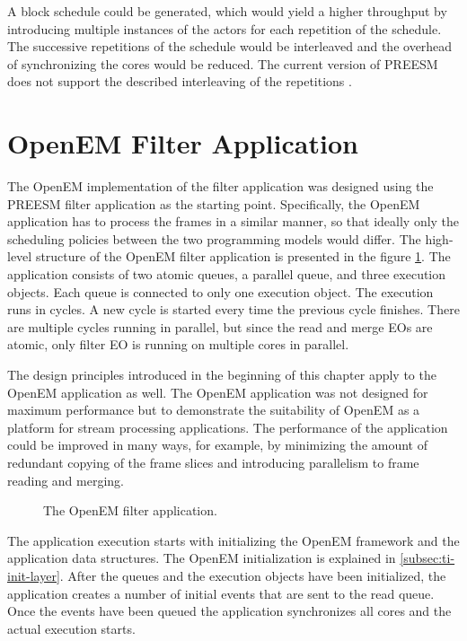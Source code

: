 A block schedule could be generated, which would yield a higher throughput by introducing multiple instances of the actors for each repetition of the schedule. The successive repetitions of the schedule would be interleaved and the overhead of synchronizing the cores would be reduced. The current version of PREESM does not support the described interleaving of the repetitions \cite{pelcat2014preesm}.

\section{OpenEM Filter Application}
\label{sec:oemapp}
The OpenEM implementation of the filter application was designed using the PREESM filter application as the starting point. Specifically, the OpenEM application has to process the frames in a similar manner, so that ideally only the scheduling policies between the two programming models would differ. The high-level structure of the OpenEM filter application is presented in the figure \ref{fig:openem_flow}. The application consists of two atomic queues, a parallel queue, and three execution objects. Each queue is connected to only one execution object. The execution runs in cycles. A new cycle is started every time the previous cycle finishes. There are multiple cycles running in parallel, but since the read and merge EOs are atomic, only filter EO is running on multiple cores in parallel.

The design principles introduced in the beginning of this chapter apply to the OpenEM application as well. The OpenEM application was not designed for maximum performance but to demonstrate the suitability of OpenEM as a platform for stream processing applications. The performance of the application could be improved in many ways, for example, by minimizing the amount of redundant copying of the frame slices and introducing parallelism to frame reading and merging.

\begin{figure}[h!]
    \begin{center}
        
        \caption{The OpenEM filter application.}
        \label{fig:openem_flow}
    \end{center}
\end{figure}

The application execution starts with initializing the OpenEM framework and the application data structures. The OpenEM initialization is explained in \ref{subsec:ti-init-layer}. After the queues and the execution objects have been initialized, the application creates a number of initial events that are sent to the read queue. Once the events have been queued the application synchronizes all cores and the actual execution starts.

